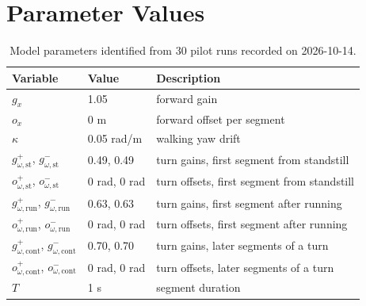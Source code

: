 \documentclass[11pt]{article}
\begin{document}
\section{Parameter Values}
\begin{table}[h]
  \centering
  \begin{tabular}{lll}
    \toprule
    Variable & Value & Description \\
    \midrule
    $g_x$ & 1.05 & forward gain \\
    $o_x$ & 0 m & forward offset per segment \\
    $\kappa$ & 0.05 rad/m & walking yaw drift \\
    $g_{\omega,\mathrm{st}}^{+}$, $g_{\omega,\mathrm{st}}^{-}$ & 0.49, 0.49 & turn gains, first segment from standstill \\
    $o_{\omega,\mathrm{st}}^{+}$, $o_{\omega,\mathrm{st}}^{-}$ & 0 rad, 0 rad & turn offsets, first segment from standstill \\
    $g_{\omega,\mathrm{run}}^{+}$, $g_{\omega,\mathrm{run}}^{-}$ & 0.63, 0.63 & turn gains, first segment after running \\
    $o_{\omega,\mathrm{run}}^{+}$, $o_{\omega,\mathrm{run}}^{-}$ & 0 rad, 0 rad & turn offsets, first segment after running \\
    $g_{\omega,\mathrm{cont}}^{+}$, $g_{\omega,\mathrm{cont}}^{-}$ & 0.70, 0.70 & turn gains, later segments of a turn \\
    $o_{\omega,\mathrm{cont}}^{+}$, $o_{\omega,\mathrm{cont}}^{-}$ & 0 rad, 0 rad & turn offsets, later segments of a turn \\
    $T$ & 1 s & segment duration \\
    \bottomrule
  \end{tabular}
  \caption{Model parameters identified from 30 pilot runs recorded on 2026-10-14.}
\end{table}
\end{document}
